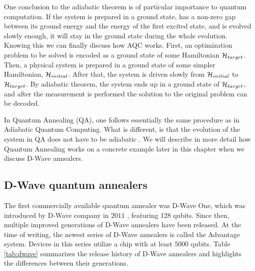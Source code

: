 One conclusion to the adiabatic theorem is of particular importance to quantum
computation. If the system is prepared in a ground state, has a non-zero gap
between its ground energy and the energy of the first excited state, and is
evolved slowly enough, it will stay in the ground state during the whole
evolution. Knowing this we can finally discuss how AQC works. First, an
optimization problem to be solved is encoded as a ground state of some
Hamiltonian $\mathcal{H}_{target}$. Then, a physical system is prepared in a ground state
of some simpler Hamiltonian, $\mathcal{H}_{initial}$. After that, the system is driven
slowly from $\mathcal{H}_{initial}$ to $\mathcal{H}_{target}$. By adiabatic theorem, the system
ends up in a ground state of $\mathcal{H}_{target}$, and after the measurement is
performed the solution to the original problem can be decoded.

In Quantum Annealing (QA), one follows essentially the same procedure as in
Adiabatic Quantum Computing. What is different, is that the evolution of the
system in QA does not have to be adiabatic \cite{Vinci2017}. We will describe
in more detail how Quantum Annealing works on a concrete example later in this
chapter when we discuss D-Wave annealers.

\subsection{D-Wave quantum annealers}

The first commercially available quantum annealer was D-Wave One, which was
introduced by D-Wave company in $2011$ \cite{johnson}, featuring 128 qubits.
Since then, multiple improved generations of D-Wave annealers have been
released. At the time of writing, the newest series of D-Wave annealers is
called the Advantage system. Devices in this series utilize a chip with at
least $5000$ qubits. Table \ref{tab:dwave} summarizes the release history of
D-Wave annealers and highlights the differences between their generations.

